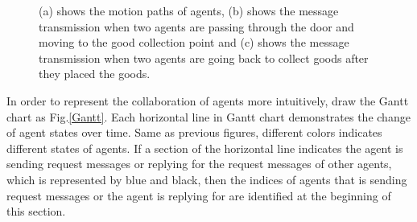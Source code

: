 \documentclass[journal]{IEEEtran}
\begin{document}
\begin{figure}
\centering
{}
\hspace{0.02cm}
\hspace{0.02cm}
\caption{(a) shows the motion paths of agents, (b) shows the message transmission when two agents are passing through the door and moving to the good collection point and (c) shows the message transmission when two agents are going back to collect goods after they placed the goods.}
\label{second}
\end{figure}
In order to represent the collaboration of agents more intuitively, draw the Gantt chart as Fig.\ref{Gantt}. Each horizontal line in Gantt chart demonstrates the change of agent states over time. Same as previous figures, different colors indicates different states of agents. If a section of the horizontal line indicates the agent is sending request messages or replying for the request messages of other agents, which is represented by blue and black, then the indices of agents that is sending request messages or the agent is replying for are identified at the beginning of this section.
\end{document}
